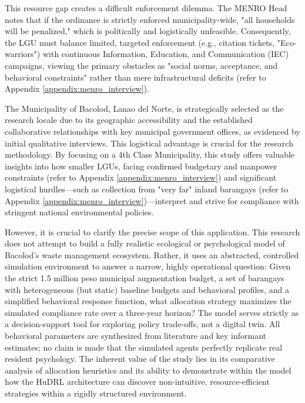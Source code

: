 This resource gap creates a difficult enforcement dilemma. The MENRO Head notes that if the ordinance is strictly enforced municipality-wide, "all households will be penalized," which is politically and logistically unfeasible. Consequently, the LGU must balance limited, targeted enforcement (e.g., citation tickets, "Eco-warriors") with continuous Information, Education, and Communication (IEC) campaigns, viewing the primary obstacles as "social norms, acceptance, and behavioral constraints" rather than mere infrastructural deficits (refer to Appendix \ref{appendix:menro_interview}).

The Municipality of Bacolod, Lanao del Norte, is strategically selected as the research locale due to its geographic accessibility and the established collaborative relationships with key municipal government offices, as evidenced by initial qualitative interviews. This logistical advantage is crucial for the research methodology. By focusing on a 4th Class Municipality, this study offers valuable insights into how smaller LGUs, facing confirmed budgetary and manpower constraints (refer to Appendix \ref{appendix:menro_interview}) and significant logistical hurdles—such as collection from "very far" inland barangays (refer to Appendix \ref{appendix:menro_interview})—interpret and strive for compliance with stringent national environmental policies.

However, it is crucial to clarify the precise scope of this application. This research does not attempt to build a fully realistic ecological or psychological model of Bacolod's waste management ecosystem. Rather, it uses an abstracted, controlled simulation environment to answer a narrow, highly operational question: Given the strict 1.5 million peso municipal augmentation budget, a set of barangays with heterogeneous (but static) baseline budgets and behavioral profiles, and a simplified behavioral response function, what allocation strategy maximizes the simulated compliance rate over a three-year horizon? The model serves strictly as a decision-support tool for exploring policy trade-offs, not a digital twin. All behavioral parameters are synthesized from literature and key informant estimates; no claim is made that the simulated agents perfectly replicate real resident psychology. The inherent value of the study lies in its comparative analysis of allocation heuristics and its ability to demonstrate within the model how the HuDRL architecture can discover non-intuitive, resource-efficient strategies within a rigidly structured environment.

